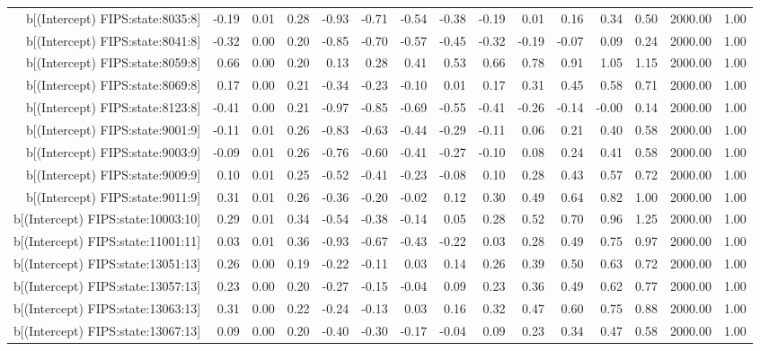 \begin{table}[ht]
\begin{tabular}{rrrrrrrrrrrrrrr}
  b[(Intercept) FIPS:state:8035:8] & -0.19 & 0.01 & 0.28 & -0.93 & -0.71 & -0.54 & -0.38 & -0.19 & 0.01 & 0.16 & 0.34 & 0.50 & 2000.00 & 1.00 \\ 
  b[(Intercept) FIPS:state:8041:8] & -0.32 & 0.00 & 0.20 & -0.85 & -0.70 & -0.57 & -0.45 & -0.32 & -0.19 & -0.07 & 0.09 & 0.24 & 2000.00 & 1.00 \\ 
  b[(Intercept) FIPS:state:8059:8] & 0.66 & 0.00 & 0.20 & 0.13 & 0.28 & 0.41 & 0.53 & 0.66 & 0.78 & 0.91 & 1.05 & 1.15 & 2000.00 & 1.00 \\ 
  b[(Intercept) FIPS:state:8069:8] & 0.17 & 0.00 & 0.21 & -0.34 & -0.23 & -0.10 & 0.01 & 0.17 & 0.31 & 0.45 & 0.58 & 0.71 & 2000.00 & 1.00 \\ 
  b[(Intercept) FIPS:state:8123:8] & -0.41 & 0.00 & 0.21 & -0.97 & -0.85 & -0.69 & -0.55 & -0.41 & -0.26 & -0.14 & -0.00 & 0.14 & 2000.00 & 1.00 \\ 
  b[(Intercept) FIPS:state:9001:9] & -0.11 & 0.01 & 0.26 & -0.83 & -0.63 & -0.44 & -0.29 & -0.11 & 0.06 & 0.21 & 0.40 & 0.58 & 2000.00 & 1.00 \\ 
  b[(Intercept) FIPS:state:9003:9] & -0.09 & 0.01 & 0.26 & -0.76 & -0.60 & -0.41 & -0.27 & -0.10 & 0.08 & 0.24 & 0.41 & 0.58 & 2000.00 & 1.00 \\ 
  b[(Intercept) FIPS:state:9009:9] & 0.10 & 0.01 & 0.25 & -0.52 & -0.41 & -0.23 & -0.08 & 0.10 & 0.28 & 0.43 & 0.57 & 0.72 & 2000.00 & 1.00 \\ 
  b[(Intercept) FIPS:state:9011:9] & 0.31 & 0.01 & 0.26 & -0.36 & -0.20 & -0.02 & 0.12 & 0.30 & 0.49 & 0.64 & 0.82 & 1.00 & 2000.00 & 1.00 \\ 
  b[(Intercept) FIPS:state:10003:10] & 0.29 & 0.01 & 0.34 & -0.54 & -0.38 & -0.14 & 0.05 & 0.28 & 0.52 & 0.70 & 0.96 & 1.25 & 2000.00 & 1.00 \\ 
  b[(Intercept) FIPS:state:11001:11] & 0.03 & 0.01 & 0.36 & -0.93 & -0.67 & -0.43 & -0.22 & 0.03 & 0.28 & 0.49 & 0.75 & 0.97 & 2000.00 & 1.00 \\ 
  b[(Intercept) FIPS:state:13051:13] & 0.26 & 0.00 & 0.19 & -0.22 & -0.11 & 0.03 & 0.14 & 0.26 & 0.39 & 0.50 & 0.63 & 0.72 & 2000.00 & 1.00 \\ 
  b[(Intercept) FIPS:state:13057:13] & 0.23 & 0.00 & 0.20 & -0.27 & -0.15 & -0.04 & 0.09 & 0.23 & 0.36 & 0.49 & 0.62 & 0.77 & 2000.00 & 1.00 \\ 
  b[(Intercept) FIPS:state:13063:13] & 0.31 & 0.00 & 0.22 & -0.24 & -0.13 & 0.03 & 0.16 & 0.32 & 0.47 & 0.60 & 0.75 & 0.88 & 2000.00 & 1.00 \\ 
  b[(Intercept) FIPS:state:13067:13] & 0.09 & 0.00 & 0.20 & -0.40 & -0.30 & -0.17 & -0.04 & 0.09 & 0.23 & 0.34 & 0.47 & 0.58 & 2000.00 & 1.00 \\ 

\end{tabular}
\end{table}
